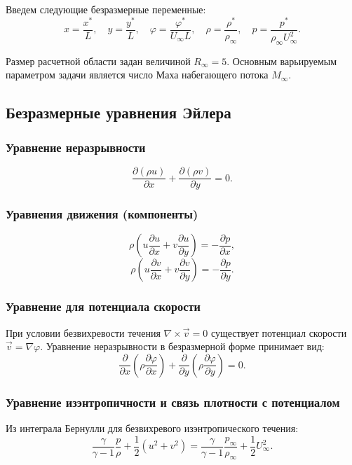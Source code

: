 \documentclass[a4paper,12pt]{article}
\begin{document}
	Введем следующие безразмерные переменные:
	\[
	x = \frac{x^*}{L}, \quad y = \frac{y^*}{L}, \quad \varphi = \frac{\varphi^*}{U_\infty L}, \quad \rho = \frac{\rho^*}{\rho_\infty}, \quad p = \frac{p^*}{\rho_\infty U_\infty^2}.
	\]
	
	Размер расчетной области задан величиной $R_\infty = 5$. Основным варьируемым параметром задачи является число Маха набегающего потока $M_\infty$.
	
	\subsection{Безразмерные уравнения Эйлера}
	
	\subsubsection{Уравнение неразрывности}
	\[
	\frac{\partial (\rho u)}{\partial x} + \frac{\partial (\rho v)}{\partial y} = 0.
	\]
	
	\subsubsection{Уравнения движения (компоненты)}
	\[
	\rho \left( u \frac{\partial u}{\partial x} + v \frac{\partial u}{\partial y} \right) = -\frac{\partial p}{\partial x},
	\]
	\[
	\rho \left( u \frac{\partial v}{\partial x} + v \frac{\partial v}{\partial y} \right) = -\frac{\partial p}{\partial y}.
	\]
	
	\subsubsection{Уравнение для потенциала скорости}
	При условии безвихревости течения $\nabla \times \vec{v} = 0$ существует потенциал скорости $\vec{v} = \nabla \varphi$. Уравнение неразрывности в безразмерной форме принимает вид:
	\[
	\frac{\partial}{\partial x} \left( \rho \frac{\partial \varphi}{\partial x} \right) + \frac{\partial}{\partial y} \left( \rho \frac{\partial \varphi}{\partial y} \right) = 0.
	\]
	
	\subsubsection{Уравнение изэнтропичности и связь плотности с потенциалом}
	
	Из интеграла Бернулли для безвихревого изэнтропического течения:
	\[
	\frac{\gamma}{\gamma-1} \frac{p}{\rho} + \frac{1}{2} (u^2 + v^2) = \frac{\gamma}{\gamma-1} \frac{p_\infty}{\rho_\infty} + \frac{1}{2} U_\infty^2.
	\]
	
\end{document}
